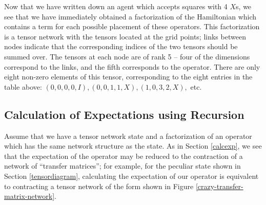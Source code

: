 \documentclass[12pt]{amsbook}
\theoremstyle{plain}
\theoremstyle{definition}
\theoremstyle{remark}
\begin{document}
Now that we have written down an agent which accepts squares with 4 $X$s, we see that we have immediately obtained a factorization of the Hamiltonian which contains a term for each possible placement of these operators.  This factorization is a tensor network with the tensors located at the grid points;  links between nodes indicate that the corresponding indices of the two tensors should be summed over.  The tensors at each node are of rank 5 -- four of the dimensions correspond to the links, and the fifth corresponds to the operator.  There are only eight non-zero elements of this tensor, corresponding to the eight entries in the table above: $(0,0,0,0,I), (0,0,1,1,X), (1,0,3,2,X),$ etc.

\subsection{Calculation of Expectations using Recursion}

Assume that we have a tensor network state and a factorization of an operator which has the same network structure as the state.  As in Section \ref{calcexp}, we see that the expectation of the operator may be reduced to the contraction of a network of ``transfer matrices'';  for example, for the peculiar state shown in Section \ref{tensordiagram}, calculating the expectation of our operator is equivalent to contracting a tensor network of the form shown in Figure \ref{crazy-transfer-matrix-network}.
\end{document}
